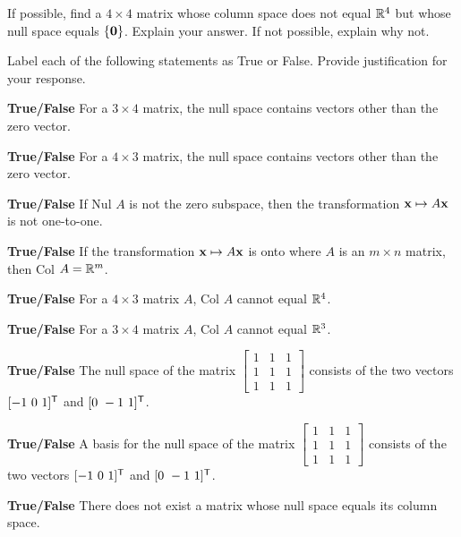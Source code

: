 \item If possible, find a $4\times 4$ matrix whose column space does not equal $\mathbb{R}^4$ but whose null space equals $\{\mathbf{0}\}$. Explain your answer. If not possible, explain why not.

\item Label each of the following statements as True or False. Provide justification for your response.
\ba
\item \textbf{True/False} For a $3\times 4$ matrix, the null space contains vectors other than the zero vector.

\item \textbf{True/False} For a $4\times 3$ matrix, the null space contains vectors other than the zero vector.

\item \textbf{True/False} If Nul $A$ is not the zero subspace, then the transformation ${\bf x} \mapsto A{\bf x}$ is not one-to-one.

\item \textbf{True/False} If the transformation ${\bf x} \mapsto A{\bf x}$ is onto where $A$ is an $m\times n$ matrix, then Col $A=\mathbb{R}^m$.

\item \textbf{True/False} For a $4\times 3$ matrix $A$, Col $A$ cannot equal $\mathbb{R}^4$.

\item \textbf{True/False} For a $3\times 4$ matrix $A$, Col $A$ cannot equal $\mathbb{R}^3$.

\item \textbf{True/False} The null space of the matrix $\begin{bmatrix} 1 & 1 & 1 \\1 & 1 & 1 \\ 1 & 1 & 1\end{bmatrix}$ consists of the two vectors $[-1 \ 0 \ 1]^{\tr}$ and $[0 \ -1 \ 1]^{\tr}$.

\item \textbf{True/False} A basis for the null space of the matrix $\begin{bmatrix} 1 & 1 & 1 \\1 & 1 & 1 \\ 1 & 1 & 1\end{bmatrix}$ consists of the two vectors $[-1 \ 0 \ 1]^{\tr}$ and $[0 \ -1 \ 1]^{\tr}$.

\item \textbf{True/False} There does not exist a matrix whose null space equals its column space.

